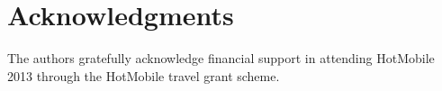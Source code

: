 \vspace{9pt}
\section*{Acknowledgments}
\vspace{-1em}
The authors gratefully acknowledge financial support in attending HotMobile 2013 
through the HotMobile travel grant scheme.
